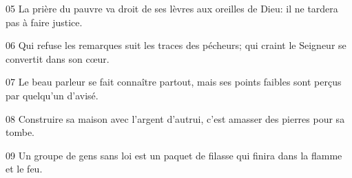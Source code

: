 
05 La prière du pauvre va droit de ses lèvres aux oreilles de Dieu: il ne tardera pas à faire justice.

06 Qui refuse les remarques suit les traces des pécheurs; qui craint le Seigneur se convertit dans son cœur.

07 Le beau parleur se fait connaître partout, mais ses points faibles sont perçus par quelqu’un d’avisé.

08 Construire sa maison avec l’argent d’autrui, c’est amasser des pierres pour sa tombe.

09 Un groupe de gens sans loi est un paquet de filasse qui finira dans la flamme et le feu.
